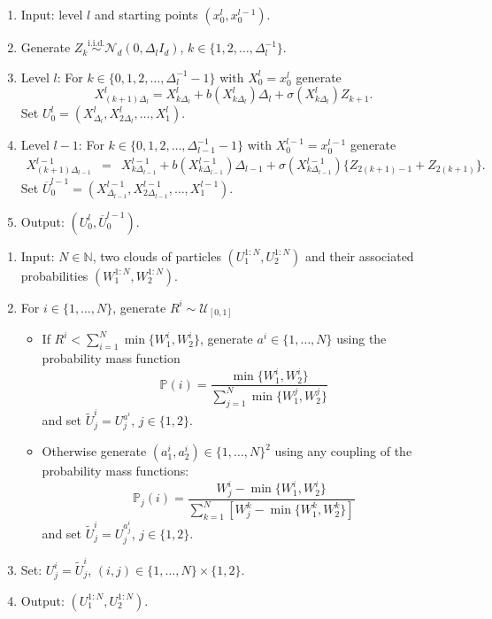 \documentclass[english]{article}
\begin{document}
\begin{algorithm}[h!]
\begin{enumerate}
\item{Input: level $l$ and starting points $(x_0^l,x_0^{l-1})$.}
\item{Generate $Z_k\stackrel{\textrm{i.i.d.}}{\sim}\mathcal{N}_d(0,\Delta_l I_d)$, $k\in\{1,2,\dots,\Delta_l^{-1}\}$.}
\item{Level $l$: For $k\in\{0,1,2,\dots,\Delta_l^{-1}-1\}$ with $X_0^l=x_0^l$ generate
$$
X_{(k+1)\Delta_l}^l = X_{k\Delta_l}^l + b(X_{k\Delta_l}^l)\Delta_l + \sigma(X_{k\Delta_l}^l)Z_{k+1}.
$$
Set $U_0^l = (X_{\Delta_l}^l,X_{2\Delta_l}^l,\dots, X_1^l)$.
}
\item{Level $l-1$: For $k\in\{0,1,2,\dots,\Delta_{l-1}^{-1}-1\}$ with $X_0^{l-1}=x_0^{l-1}$ generate
\begin{eqnarray*}
X_{(k+1)\Delta_{l-1}}^{l-1} & = & X_{k\Delta_{l-1}}^{l-1} + b(X_{k\Delta_{l-1}}^{l-1})\Delta_{l-1} + \sigma(X_{k\Delta_{l-1}}^{l-1})\{Z_{2(k+1)-1}+Z_{2(k+1)}\}.
\end{eqnarray*}
}
Set $\overline{U}_0^{l-1} = (X_{\Delta_{l-1}}^{l-1},X_{2\Delta_{l-1}}^{l-1},\dots, X_1^{l-1})$.
\item{Output: $(U_0^l,\overline{U}_0^{l-1})$.}
\end{enumerate}
\caption{Coupled Euler Scheme on $[0,1]$.}
\label{alg:coup_euler}
\end{algorithm}

\begin{algorithm}[h!]
\begin{enumerate}
\item{Input: $N\in\mathbb{N}$, two clouds of particles $(U_1^{1:N},U_2^{1:N})$ and their associated probabilities $(W_1^{1:N},W_2^{1:N})$.}
\item{For $i\in\{1,\dots,N\}$, generate $R^i\sim\mathcal{U}_{[0,1]}$
\begin{itemize}
\item{If $R^i<\sum_{i=1}^N \min\{W_1^i,W_2^i\}$, generate $a^i\in\{1,\dots,N\}$ using the probability mass function
$$
\mathbb{P}(i) = \frac{\min\{W_1^i,W_2^i\}}{\sum_{j=1}^N \min\{W_1^j,W_2^j\}}
$$
and set $\tilde{U}_j^i=U_j^{a^i}$, 
$j\in\{1,2\}$.}
\item{Otherwise generate $(a_1^i,a_2^i)\in\{1,\dots,N\}^2$ using any coupling of the probability mass functions:
$$
\mathbb{P}_j(i) = \frac{W_j^i-\min\{W_1^i,W_2^i\}}{\sum_{k=1}^N[W_j^k-\min\{W_1^k,W_2^k\}]}
$$
and set $\tilde{U}_j^i=U_j^{a_j^i}$,  $j\in\{1,2\}$.}
\end{itemize}
}
\item{Set: $U_j^i=\tilde{U}_j^{i}$, $(i,j)\in\{1,\dots,N\}\times\{1,2\}$.}
\item{Output: $(U_1^{1:N},U_2^{1:N})$.}
\end{enumerate}
\caption{Maximal Coupling Resampling}
\label{alg:max_coup}
\end{algorithm}
\end{document}
